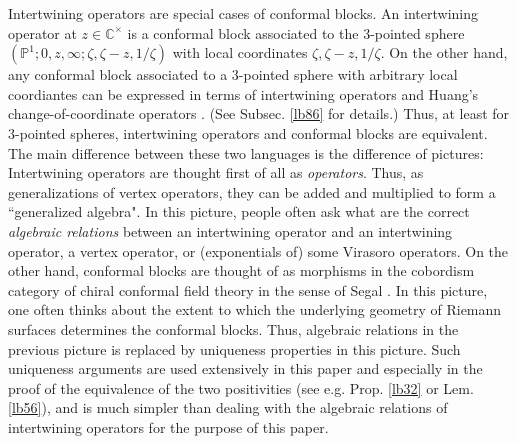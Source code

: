\documentclass[11pt,b5paper,notitlepage]{article}
\theoremstyle{definition}
\theoremstyle{plain}
\newcommand{\Cbb}{\mathbb C}
\newcommand{\Pbb}{\mathbb P}
\numberwithin{equation}{section}
\begin{document}
Intertwining operators are special cases of conformal blocks. An intertwining operator at $z\in\Cbb^\times$ is a conformal block associated to the $3$-pointed sphere $(\Pbb^1;0,z,\infty;\zeta,\zeta-z,1/\zeta)$ with local coordinates $\zeta,\zeta-z,1/\zeta$. On the other hand, any conformal block associated to a $3$-pointed sphere with arbitrary local coordiantes can be expressed in terms of intertwining operators and Huang's change-of-coordinate operators \cite{Hua97}. (See Subsec. \ref{lb86} for details.) Thus, at least for $3$-pointed spheres, intertwining operators and conformal blocks are equivalent. The main difference between these two languages is the difference of pictures: Intertwining operators are thought first of all as \emph{operators}. Thus, as generalizations of vertex operators, they can be added and multiplied to form a ``generalized algebra". In this picture, people often ask what are the correct \emph{algebraic relations} between an intertwining operator and an intertwining operator, a vertex operator, or (exponentials of) some Virasoro operators. On the other hand, conformal blocks are thought of as morphisms in the cobordism category of chiral conformal field theory in the sense of Segal \cite{Seg04}. In this picture, one often thinks about the extent to which the underlying geometry of Riemann surfaces determines the conformal blocks. Thus, algebraic relations in the previous picture is replaced by uniqueness properties in this picture. Such uniqueness arguments are used extensively in this paper and especially in the proof of the equivalence of the two positivities (see e.g. Prop. \ref{lb32} or Lem. \ref{lb56}), and is much simpler than dealing with the algebraic relations of intertwining operators for the purpose of this paper.
\end{document}
